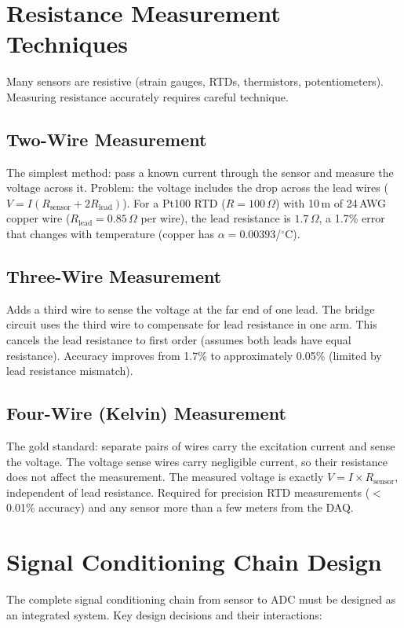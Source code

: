 \documentclass[11pt,letterpaper,twoside,openany]{book}
\newcommand{\degC}{\ensuremath{{}^{\circ}\text{C}}}
\begin{document}
\section{Resistance Measurement Techniques}
Many sensors are resistive (strain gauges, RTDs, thermistors, potentiometers). Measuring resistance accurately requires careful technique.

\subsection{Two-Wire Measurement}
The simplest method: pass a known current through the sensor and measure the voltage across it. Problem: the voltage includes the drop across the lead wires ($V = I(R_{\text{sensor}} + 2R_{\text{lead}})$). For a Pt100 RTD ($R = 100\,\Omega$) with 10\,m of 24\,AWG copper wire ($R_{\text{lead}} = 0.85\,\Omega$ per wire), the lead resistance is $1.7\,\Omega$, a 1.7\% error that changes with temperature (copper has $\alpha = 0.00393$/\degC{}).

\subsection{Three-Wire Measurement}
Adds a third wire to sense the voltage at the far end of one lead. The bridge circuit uses the third wire to compensate for lead resistance in one arm. This cancels the lead resistance to first order (assumes both leads have equal resistance). Accuracy improves from 1.7\% to approximately 0.05\% (limited by lead resistance mismatch).

\subsection{Four-Wire (Kelvin) Measurement}
The gold standard: separate pairs of wires carry the excitation current and sense the voltage. The voltage sense wires carry negligible current, so their resistance does not affect the measurement. The measured voltage is exactly $V = I \times R_{\text{sensor}}$, independent of lead resistance. Required for precision RTD measurements ($<$0.01\% accuracy) and any sensor more than a few meters from the DAQ.

\section{Signal Conditioning Chain Design}
The complete signal conditioning chain from sensor to ADC must be designed as an integrated system. Key design decisions and their interactions:
\end{document}
